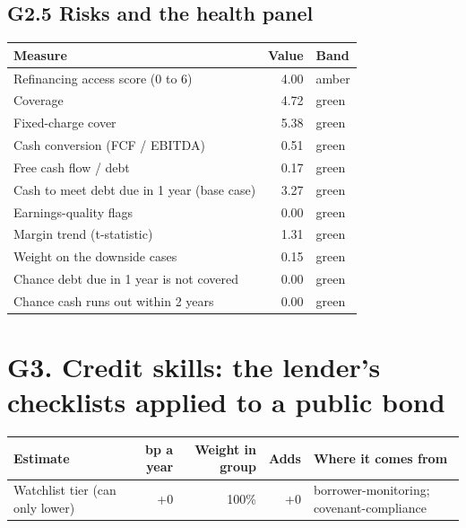 \documentclass[11pt,a4paper]{article}
\begin{document}
\subsection*{G2.5 Risks and the health panel}
\begin{center}\footnotesize\setlength{\tabcolsep}{3.5pt}\begin{tabular}{@{}lrl@{}}\toprule
Measure & Value & Band \\\midrule
Refinancing access score (0 to 6) & 4.00 & \textcolor{amber}{amber} \\
Coverage & 4.72 & \textcolor{good}{green} \\
Fixed-charge cover & 5.38 & \textcolor{good}{green} \\
Cash conversion (FCF / EBITDA) & 0.51 & \textcolor{good}{green} \\
Free cash flow / debt & 0.17 & \textcolor{good}{green} \\
Cash to meet debt due in 1 year (base case) & 3.27 & \textcolor{good}{green} \\
Earnings-quality flags & 0.00 & \textcolor{good}{green} \\
Margin trend (t-statistic) & 1.31 & \textcolor{good}{green} \\
Weight on the downside cases & 0.15 & \textcolor{good}{green} \\
Chance debt due in 1 year is not covered & 0.00 & \textcolor{good}{green} \\
Chance cash runs out within 2 years & 0.00 & \textcolor{good}{green} \\
\bottomrule\end{tabular}\end{center}
\section*{G3. Credit skills: the lender's checklists applied to a public bond}
\par\noindent{}
\begin{center}\footnotesize\setlength{\tabcolsep}{3.5pt}\begin{tabular}{@{}p{6.2cm}rrrp{4.2cm}@{}}\toprule
Estimate & bp a year & Weight in group & Adds & Where it comes from \\\midrule
Watchlist tier (can only lower) & +0 & 100\% & +0 & borrower-monitoring; covenant-compliance \\
\bottomrule\end{tabular}\end{center}
\end{document}
